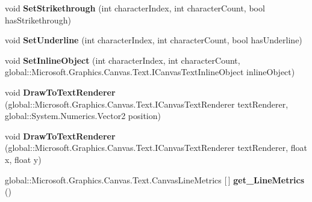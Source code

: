 \begin{DoxyCompactItemize}
\item 
\mbox{\label{interface_microsoft_1_1_graphics_1_1_canvas_1_1_text_1_1_i_canvas_text_layout_adf262145bc6d14b65076e7bb974b82d4}} 
void {\bfseries Set\+Strikethrough} (int character\+Index, int character\+Count, bool has\+Strikethrough)
\item 
\mbox{\label{interface_microsoft_1_1_graphics_1_1_canvas_1_1_text_1_1_i_canvas_text_layout_a629390d20f6e2f22860ca237e72881ee}} 
void {\bfseries Set\+Underline} (int character\+Index, int character\+Count, bool has\+Underline)
\item 
\mbox{\label{interface_microsoft_1_1_graphics_1_1_canvas_1_1_text_1_1_i_canvas_text_layout_a36f4e4337bca474c30dbc45e8e5271af}} 
void {\bfseries Set\+Inline\+Object} (int character\+Index, int character\+Count, global\+::\+Microsoft.\+Graphics.\+Canvas.\+Text.\+I\+Canvas\+Text\+Inline\+Object inline\+Object)
\item 
\mbox{\label{interface_microsoft_1_1_graphics_1_1_canvas_1_1_text_1_1_i_canvas_text_layout_ae1ee823236a004edbcb90267c853b058}} 
void {\bfseries Draw\+To\+Text\+Renderer} (global\+::\+Microsoft.\+Graphics.\+Canvas.\+Text.\+I\+Canvas\+Text\+Renderer text\+Renderer, global\+::\+System.\+Numerics.\+Vector2 position)
\item 
\mbox{\label{interface_microsoft_1_1_graphics_1_1_canvas_1_1_text_1_1_i_canvas_text_layout_a97cc5738dc8df87ea520f6446b3f5053}} 
void {\bfseries Draw\+To\+Text\+Renderer} (global\+::\+Microsoft.\+Graphics.\+Canvas.\+Text.\+I\+Canvas\+Text\+Renderer text\+Renderer, float x, float y)
\item 
\mbox{\label{interface_microsoft_1_1_graphics_1_1_canvas_1_1_text_1_1_i_canvas_text_layout_aed7ad1845a233070df02e428dca2f7c2}} 
global\+::\+Microsoft.\+Graphics.\+Canvas.\+Text.\+Canvas\+Line\+Metrics \mbox{[}$\,$\mbox{]} {\bfseries get\+\_\+\+Line\+Metrics} ()

\end{DoxyCompactItemize}
